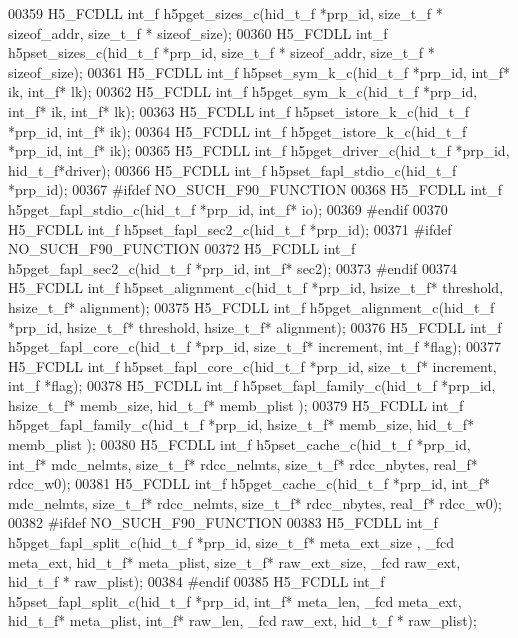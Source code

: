 \begin{DoxyCode}
00359 H5\_FCDLL int\_f h5pget\_sizes\_c(hid\_t\_f *prp\_id, size\_t\_f * sizeof\_addr, size\_t\_f * sizeof\_size);
00360 H5\_FCDLL int\_f h5pset\_sizes\_c(hid\_t\_f *prp\_id, size\_t\_f * sizeof\_addr, size\_t\_f * sizeof\_size);
00361 H5\_FCDLL int\_f h5pset\_sym\_k\_c(hid\_t\_f *prp\_id, int\_f* ik, int\_f* lk);
00362 H5\_FCDLL int\_f h5pget\_sym\_k\_c(hid\_t\_f *prp\_id, int\_f* ik, int\_f* lk);
00363 H5\_FCDLL int\_f h5pset\_istore\_k\_c(hid\_t\_f *prp\_id, int\_f* ik);
00364 H5\_FCDLL int\_f h5pget\_istore\_k\_c(hid\_t\_f *prp\_id, int\_f* ik);
00365 H5\_FCDLL int\_f h5pget\_driver\_c(hid\_t\_f *prp\_id, hid\_t\_f*driver);
00366 H5\_FCDLL int\_f h5pset\_fapl\_stdio\_c(hid\_t\_f *prp\_id);
00367 \textcolor{preprocessor}{#ifdef NO\_SUCH\_F90\_FUNCTION}
00368 H5\_FCDLL int\_f h5pget\_fapl\_stdio\_c(hid\_t\_f *prp\_id, int\_f* io);
00369 \textcolor{preprocessor}{#endif}
00370 H5\_FCDLL int\_f h5pset\_fapl\_sec2\_c(hid\_t\_f *prp\_id);
00371 \textcolor{preprocessor}{#ifdef NO\_SUCH\_F90\_FUNCTION}
00372 H5\_FCDLL int\_f h5pget\_fapl\_sec2\_c(hid\_t\_f *prp\_id, int\_f* sec2);
00373 \textcolor{preprocessor}{#endif}
00374 H5\_FCDLL int\_f h5pset\_alignment\_c(hid\_t\_f *prp\_id, hsize\_t\_f* threshold, hsize\_t\_f* alignment);
00375 H5\_FCDLL int\_f h5pget\_alignment\_c(hid\_t\_f *prp\_id, hsize\_t\_f* threshold, hsize\_t\_f* alignment);
00376 H5\_FCDLL int\_f h5pget\_fapl\_core\_c(hid\_t\_f *prp\_id, size\_t\_f* increment, int\_f *flag);
00377 H5\_FCDLL int\_f h5pset\_fapl\_core\_c(hid\_t\_f *prp\_id, size\_t\_f* increment, int\_f *flag);
00378 H5\_FCDLL int\_f h5pset\_fapl\_family\_c(hid\_t\_f *prp\_id, hsize\_t\_f* memb\_size, hid\_t\_f* memb\_plist );
00379 H5\_FCDLL int\_f h5pget\_fapl\_family\_c(hid\_t\_f *prp\_id, hsize\_t\_f* memb\_size, hid\_t\_f* memb\_plist );
00380 H5\_FCDLL int\_f h5pset\_cache\_c(hid\_t\_f *prp\_id, int\_f* mdc\_nelmts, size\_t\_f* rdcc\_nelmts, size\_t\_f* 
      rdcc\_nbytes, real\_f* rdcc\_w0);
00381 H5\_FCDLL int\_f h5pget\_cache\_c(hid\_t\_f *prp\_id, int\_f* mdc\_nelmts, size\_t\_f* rdcc\_nelmts, size\_t\_f* 
      rdcc\_nbytes, real\_f* rdcc\_w0);
00382 \textcolor{preprocessor}{#ifdef NO\_SUCH\_F90\_FUNCTION}
00383 H5\_FCDLL int\_f h5pget\_fapl\_split\_c(hid\_t\_f *prp\_id, size\_t\_f* meta\_ext\_size , \_fcd meta\_ext, hid\_t\_f* 
      meta\_plist, size\_t\_f* raw\_ext\_size, \_fcd raw\_ext, hid\_t\_f * raw\_plist);
00384 \textcolor{preprocessor}{#endif}
00385 H5\_FCDLL int\_f h5pset\_fapl\_split\_c(hid\_t\_f *prp\_id, int\_f* meta\_len, \_fcd meta\_ext, hid\_t\_f* meta\_plist, 
      int\_f* raw\_len, \_fcd raw\_ext, hid\_t\_f * raw\_plist);

\end{DoxyCode}

